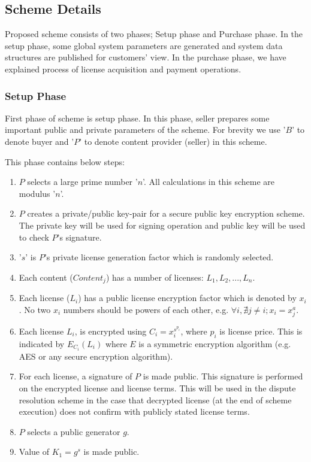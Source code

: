 \documentclass[times]{secauth}
\begin{document}
\subsection{Scheme Details}
\label{sec:scheme_details}
Proposed scheme consists of two phases; Setup phase and Purchase phase. In the setup phase, some global system parameters are generated and system data structures are published for customers' view. In the purchase phase, we have explained process of license acquisition and payment operations.

\subsubsection{Setup Phase}
First phase of scheme is setup phase. In this phase, seller prepares some important public and private parameters of the scheme. For brevity we use '$B$' to denote buyer and '$P$' to denote content provider (seller) in this scheme.

This phase contains below steps:

\begin{enumerate}
\item $P$ selects a large prime number '$n$'. All calculations in this scheme are modulus '$n$'.
\item $P$ creates a private/public key-pair for a secure public key encryption scheme. The private key will be used for signing operation and public key will be used to check $P$'s signature.
\item '$s$' is $P$'s private license generation factor which is randomly selected.
\item Each content ($Content_j$) has a number of licenses: $L_1,L_2,...,L_n$.
\item Each license ($L_i$) has a public license encryption factor which is denoted by $x_i$. No two $x_i$ numbers should be powers of each other, e.g. $\forall i, \nexists j \neq i;x_i=x_j^a$.
\item Each license $L_i$, is encrypted using $C_i=x_i^{s^{p_i}}$, where $p_i$ is license price. This is indicated by $E_{C_i}(L_i )$ where $E$ is a symmetric encryption algorithm (e.g. AES or any secure encryption algorithm). 
\item For each license, a signature of $P$ is made public. This signature is performed on the encrypted license and license terms. This will be used in the dispute resolution scheme in the case that decrypted license (at the end of scheme execution) does not confirm with publicly stated license terms. 
\item $P$ selects a public generator $g$.
\item Value of $K_1=g^s$ is made public.
\end{enumerate}
	
\end{document}
